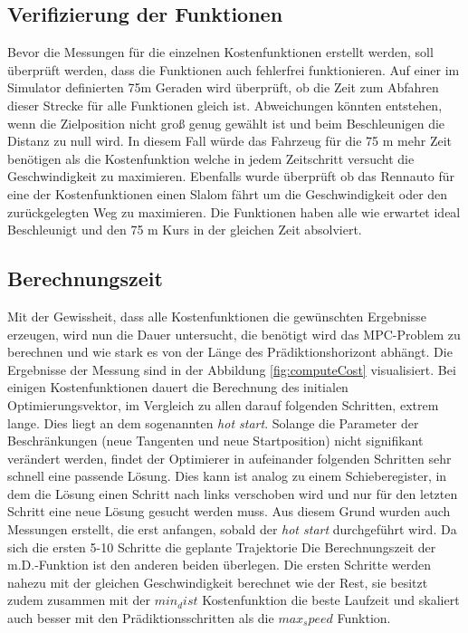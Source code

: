 \documentclass{like}
\begin{document}
\subsection{Verifizierung der Funktionen}
Bevor die Messungen für die einzelnen Kostenfunktionen erstellt werden, soll überprüft werden, dass die Funktionen auch fehlerfrei funktionieren. Auf einer im Simulator definierten 75m Geraden wird überprüft, ob die Zeit zum Abfahren dieser Strecke für alle Funktionen gleich ist. Abweichungen könnten entstehen, wenn die Zielposition nicht groß genug gewählt ist und beim Beschleunigen die Distanz zu null wird. In diesem Fall würde das Fahrzeug für die 75 m mehr Zeit benötigen als die Kostenfunktion welche in jedem Zeitschritt versucht die Geschwindigkeit zu maximieren. Ebenfalls wurde überprüft ob das Rennauto für eine der Kostenfunktionen einen Slalom fährt um die Geschwindigkeit oder den zurückgelegten Weg zu maximieren.
Die Funktionen haben alle wie erwartet ideal Beschleunigt und den 75 m Kurs in der gleichen Zeit absolviert.

\subsection{Berechnungszeit}
\label{runtime}
Mit der Gewissheit, dass alle Kostenfunktionen die gewünschten Ergebnisse erzeugen, wird nun die Dauer untersucht, die benötigt wird das \ac{MPC}-Problem zu berechnen und wie stark es von der Länge des Prädiktionshorizont abhängt. 
Die Ergebnisse der Messung sind in der Abbildung \ref{fig:computeCost} visualisiert. Bei einigen Kostenfunktionen dauert die  Berechnung des initialen Optimierungsvektor, im Vergleich zu allen darauf folgenden Schritten, extrem lange. Dies liegt an dem sogenannten \emph{hot start}. Solange die Parameter der Beschränkungen (neue Tangenten und neue Startposition) nicht signifikant verändert werden, findet der Optimierer in aufeinander folgenden Schritten sehr schnell eine passende Lösung. Dies kann ist analog zu einem Schieberegister, in dem die Lösung einen Schritt nach links verschoben wird und nur für den letzten Schritt eine neue Lösung gesucht werden muss. Aus diesem Grund wurden auch Messungen erstellt, die erst anfangen, sobald der \emph{hot start} durchgeführt wird. 
Da sich die ersten 5-10 Schritte die geplante Trajektorie 
Die Berechnungszeit der \ac{m.D.}-Funktion ist den anderen beiden überlegen. Die ersten Schritte werden nahezu mit der gleichen Geschwindigkeit berechnet wie der Rest, sie besitzt zudem zusammen mit der $min_dist$ Kostenfunktion die beste Laufzeit und skaliert auch besser mit den Prädiktionsschritten als die $max_speed$ Funktion.
\end{document}

